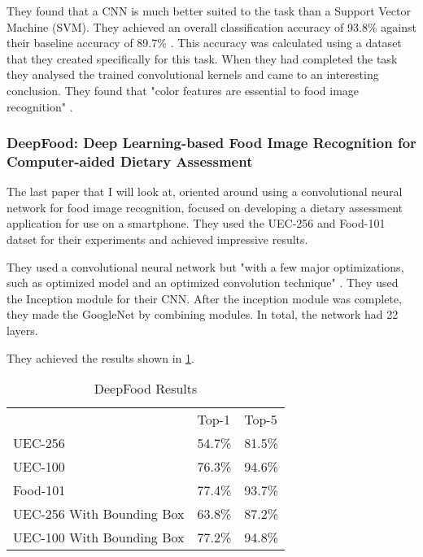 They found that a CNN is much better suited to the task than a Support Vector
Machine (SVM). They achieved an overall classification accuracy of 93.8\%
against their baseline accuracy of 89.7\% \textcite{kagayaFood}. This accuracy
was calculated using a dataset that they created specifically for this task.
When they had completed the task they analysed the trained convolutional kernels
and came to an interesting conclusion. They found that "color features are
essential to food image recognition" \textcite{kagayaFood}.

\subsubsection*{DeepFood: Deep Learning-based Food Image Recognition for
Computer-aided Dietary Assessment}
The last paper that I will look at, oriented around using a convolutional neural
network for food image recognition, focused on developing a dietary assessment
application for use on a smartphone. They used the UEC-256 and Food-101 datset
for their experiments and achieved impressive results.

They used a convolutional neural network but "with a few major optimizations,
such as optimized model and an optimized convolution technique"
\textcite{deepFood}. They used the Inception module for their CNN. After the
inception module was complete, they made the GoogleNet by combining modules. In
total, the network had 22 layers.

They achieved the results shown in \ref{resultsDeepFood}.

\begin{table}[]
	\centering
	\caption{DeepFood Results}
	\label{resultsDeepFood}
	\begin{tabular}{lll}
		                          & Top-1  & Top-5  \\
								  UEC-256                   & 54.7\% & 81.5\% \\
								  UEC-100                   & 76.3\% & 94.6\% \\
								  Food-101                  & 77.4\% & 93.7\% \\
								  UEC-256 With Bounding Box & 63.8\% & 87.2\% \\
								  UEC-100 With Bounding Box & 77.2\% & 94.8\%
	\end{tabular}
\end{table}

